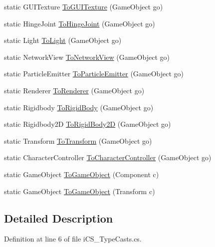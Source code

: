 \begin{DoxyCompactItemize}
\item 
static G\+U\+I\+Texture \hyperlink{classi_c_s___type_casts_aa6fffc4e65e2b43616314f81a94706b3}{To\+G\+U\+I\+Texture} (Game\+Object go)
\item 
static Hinge\+Joint \hyperlink{classi_c_s___type_casts_a508b22eb0633ba16b482f92e09b0568d}{To\+Hinge\+Joint} (Game\+Object go)
\item 
static Light \hyperlink{classi_c_s___type_casts_a0369d8796b47d3f81e772d5e66f1e4b4}{To\+Light} (Game\+Object go)
\item 
static Network\+View \hyperlink{classi_c_s___type_casts_a47f7dd25f38492d97b214694c70cdb0d}{To\+Network\+View} (Game\+Object go)
\item 
static Particle\+Emitter \hyperlink{classi_c_s___type_casts_a69c89f5ef01e0ae87886c9ab12ee0c0d}{To\+Particle\+Emitter} (Game\+Object go)
\item 
static Renderer \hyperlink{classi_c_s___type_casts_a3325c996c921325d5d9c462e154914ba}{To\+Renderer} (Game\+Object go)
\item 
static Rigidbody \hyperlink{classi_c_s___type_casts_a64096471b63d3899f7dfc7898dce8499}{To\+Rigid\+Body} (Game\+Object go)
\item 
static Rigidbody2\+D \hyperlink{classi_c_s___type_casts_ad324bfab4559a48d7e590fd718e1769b}{To\+Rigid\+Body2\+D} (Game\+Object go)
\item 
static Transform \hyperlink{classi_c_s___type_casts_ab1441adcedd5703c0d464cce228526b1}{To\+Transform} (Game\+Object go)
\item 
static Character\+Controller \hyperlink{classi_c_s___type_casts_a46b0e593d2088aa407dd541f32af65c6}{To\+Character\+Controller} (Game\+Object go)
\item 
static Game\+Object \hyperlink{classi_c_s___type_casts_afea79c8e9c9a08740dcceac469413257}{To\+Game\+Object} (Component c)
\item 
static Game\+Object \hyperlink{classi_c_s___type_casts_a91e25d69baa1ce16eee92837997599a0}{To\+Game\+Object} (Transform c)
\end{DoxyCompactItemize}


\subsection{Detailed Description}


Definition at line 6 of file i\+C\+S\+\_\+\+Type\+Casts.\+cs.



